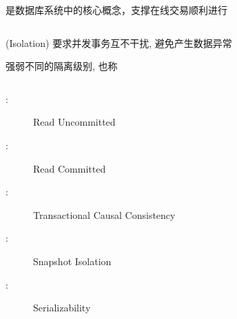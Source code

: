 
\begin{frame}{}
  \begin{center}
    是数据库系统中的核心概念，支撑在线交易顺利进行
  \end{center}

  \begin{columns}
  \end{columns}

  \vspace{0.30cm}
  \begin{center}
     (Isolation) 要求并发事务互不干扰, 避免产生数据异常
  \end{center}
\end{frame}

\begin{frame}{}
  \begin{center}
    强弱不同的隔离级别, 也称

    \vspace{0.30cm}

    \begin{columns}
        \begin{description}
          \item[\ru:] Read Uncommitted
          \item[\rc:] Read Committed
          \item[\tcc:] Transactional Causal Consistency
          \item[\si:] Snapshot Isolation
          \item[\ser:] Serializability
        \end{description}
    \end{columns}
  \end{center}
\end{frame}


